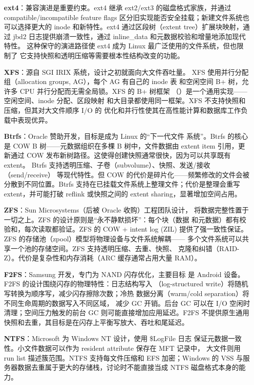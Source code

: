 \begin{filesystemlayout}

\noindent\textbf{ext4}：兼容演进是重要约束。ext4 继承 ext2/ext3 的磁盘格式家族，并通过 compatible/incompatible feature flags 区分旧实现能否安全挂载；新建文件系统也可以选择更大的 inode 和新特性。ext4 通过区段树（extent tree）扩展块映射，通过 jbd2
日志提供崩溃一致性，通过 inline\_data 和元数据校验和增量地添加现代特性。
这种保守的演进路径使 ext4 成为 Linux 最广泛使用的文件系统，但也限制了
它支持快照和透明压缩等需要根本性结构改变的功能。

\noindent\textbf{XFS}：源自 SGI IRIX 系统，设计之初就面向大文件吞吐量。
XFS 使用并行分配组（allocation groups, AG），每个 AG 有自己的 inode 表
和空闲空间 B+ 树，允许多 CPU 并行分配而无需全局锁。XFS 的 B+ 树框架
（）是一个通用实现——空闲空间、inode 分配、区段映射
和大目录都使用同一框架。XFS 不支持快照和压缩，但其对大文件顺序 I/O 的
优化和并行性使其在高性能计算和数据库工作负载中表现优异。

\noindent\textbf{Btrfs}：Oracle 赞助开发，目标是成为 Linux 的``下一代文件
系统''。Btrfs 的核心是 COW B 树——元数据组织在多棵 B 树中，文件数据由 extent item 引用，更新通过 COW 发布新树路径。这使得创建快照通常很快，因为可以共享既有 extent。
Btrfs 支持透明压缩、子卷（subvolume）、快照、发送/接收（send/receive）
等现代特性。但 COW 的代价是碎片化——频繁修改的文件会被分散到不同位置。Btrfs 支持在已挂载文件系统上整理文件；代价是整理会重写 extent，并可能打破 reflink 或快照之间的 extent sharing，显著增加空间占用。

\noindent\textbf{ZFS}：Sun Microsystems（后被 Oracle 收购）工程团队设计，
将数据完整性置于一切之上。ZFS 的设计原则是``永不静默损坏''：每个块（数据
和元数据）都有校验和，每次读取都验证。ZFS 的 COW + intent log (ZIL)
提供了强一致性保证。ZFS 的存储池（zpool）模型将物理设备与文件系统解耦——
多个文件系统可以共享一个池的存储空间。ZFS 支持透明压缩、去重、快照、
克隆和纠错（RAID-Z）。代价是复杂性和内存消耗（ARC 缓存通常占用大量 RAM）。

\noindent\textbf{F2FS}：Samsung 开发，专门为 NAND 闪存优化，主要目标
是 Android 设备。F2FS 的设计围绕闪存的物理特性：日志结构写入
（log-structured write）将随机写转换为顺序写，减少闪存擦除次数；冷热
数据分离（warm/cold separation）将不同生命周期的数据写入不同区域，
减少 GC 开销。后台 GC 可以在 I/O 空闲时清理；空间压力触发的前台 GC 则可能直接增加应用延迟。F2FS 不提供原生通用快照和去重，其目标是在闪存上平衡写放大、吞吐和尾延迟。

\noindent\textbf{NTFS}：Microsoft 为 Windows NT 设计，使用 \$LogFile 日志
保证元数据一致性。小文件数据可以作为 resident attribute 保存在 MFT 记录中，
大文件则用 run list 描述簇范围。NTFS 支持每文件压缩和 EFS 加密；Windows 的
VSS 与服务器数据去重属于更大的存储栈，讨论时不能直接当成 NTFS 磁盘格式本身的能力。


\end{filesystemlayout}
